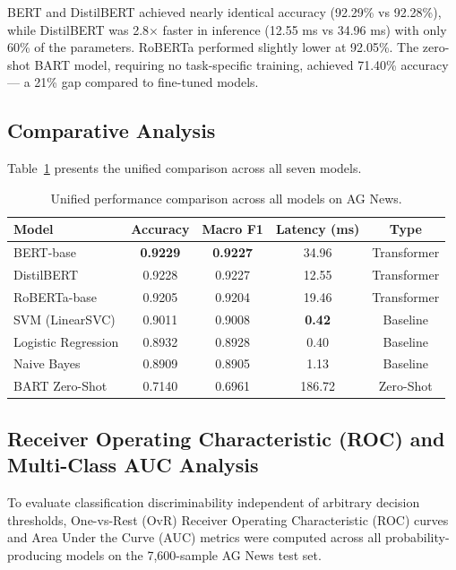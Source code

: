 \documentclass[12pt, a4paper]{article}
\begin{document}
BERT and DistilBERT achieved nearly identical accuracy (92.29\% vs 92.28\%), while DistilBERT was 2.8$\times$ faster in inference (12.55 ms vs 34.96 ms) with only 60\% of the parameters. RoBERTa performed slightly lower at 92.05\%. The zero-shot BART model, requiring no task-specific training, achieved 71.40\% accuracy --- a 21\% gap compared to fine-tuned models.

\subsection{Comparative Analysis}

Table~\ref{tab:comparison} presents the unified comparison across all seven models.

\begin{table}[H]
    \centering
    \caption{Unified performance comparison across all models on AG News.}
    \label{tab:comparison}
    \begin{tabular}{lcccc}
        \toprule
        \textbf{Model} & \textbf{Accuracy} & \textbf{Macro F1} & \textbf{Latency (ms)} & \textbf{Type} \\
        \midrule
        BERT-base & \textbf{0.9229} & \textbf{0.9227} & 34.96 & Transformer \\
        DistilBERT & 0.9228 & 0.9227 & 12.55 & Transformer \\
        RoBERTa-base & 0.9205 & 0.9204 & 19.46 & Transformer \\
        SVM (LinearSVC) & 0.9011 & 0.9008 & \textbf{0.42} & Baseline \\
        Logistic Regression & 0.8932 & 0.8928 & 0.40 & Baseline \\
        Naive Bayes & 0.8909 & 0.8905 & 1.13 & Baseline \\
        BART Zero-Shot & 0.7140 & 0.6961 & 186.72 & Zero-Shot \\
        \bottomrule
    \end{tabular}
\end{table}

\subsection{Receiver Operating Characteristic (ROC) and Multi-Class AUC Analysis}
To evaluate classification discriminability independent of arbitrary decision thresholds, One-vs-Rest (OvR) Receiver Operating Characteristic (ROC) curves and Area Under the Curve (AUC) metrics were computed across all probability-producing models on the 7,600-sample AG News test set.
\end{document}
